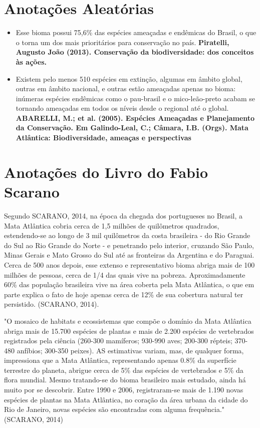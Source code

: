 \documentclass{article}
\begin{document}
\section{Anotações Aleatórias}
\begin{itemize}
    \item Esse bioma possui 75,6\% das espécies ameaçadas e endêmicas do Brasil, o que o torna um dos mais prioritários para conservação no país. \textbf{Piratelli, Augusto João (2013). Conservação da biodiversidade: dos conceitos às ações.}
    \item Existem pelo menos 510 espécies em extinção, algumas em âmbito global, outras em âmbito nacional, e outras estão ameaçadas apenas no bioma: inúmeras espécies endêmicas como o pau-brasil e o mico-leão-preto acabam se tornando ameaçadas em todos os níveis desde o regional até o global. \textbf{ABARELLI, M.; et al. (2005). Espécies Ameaçadas e Planejamento da Conservação. Em Galindo-Leal, C.; Câmara, I.B. (Orgs). Mata Atlântica: Biodiversidade, ameaças e perspectivas}
\end{itemize}

\section{Anotações do Livro do Fabio Scarano}

Segundo SCARANO, 2014, na época da chegada dos portugueses no Brasil, a Mata Atlântica cobria cerca de 1,5 milhões de quilômetros quadrados, estendendo-se ao longo de 3 mil quilômetros da costa brasileira - do Rio Grande do Sul ao Rio Grande do Norte - e penetrando pelo interior, cruzando São Paulo, Minas Gerais e Mato Grosso do Sul até as fronteiras da Argentina e do Paraguai. Cerca de 500 anos depois, esse extenso e representativo bioma abriga mais de 100 milhões de pessoas, cerca de 1/4 das quais vive na pobreza. Aproximadamente 60\% das população brasileira vive na área coberta pela Mata Atlântica, o que em parte explica o fato de hoje apenas cerca de 12\% de sua cobertura natural ter persistido. (SCARANO, 2014).

"O mosaico de habitats e ecossistemas que compõe o domínio da Mata Atlântica abriga mais de 15.700 espécies de plantas e mais de 2.200 espécies de vertebrados registrados pela ciência (260-300 mamíferos; 930-990 aves; 200-300 répteis; 370-480 anfíbios; 300-350 peixes). AS estimativas variam, mas, de qualquer forma, impressiona que a Mata Atlântica, representando apenas 0.8\% da superfície terrestre do planeta, abrigue cerca de 5\% das espécies de vertebrados e 5\% da flora mundial. Mesmo tratando-se do bioma brasileiro mais estudado, ainda há muito por se descobrir. Entre 1990 e 2006, registraram-se mais de 1.190 novas espécies de plantas na Mata Atlântica, no coração da área urbana da cidade do Rio de Janeiro, novas espécies são encontradas com alguma frequência." (SCARANO, 2014)
\end{document}
